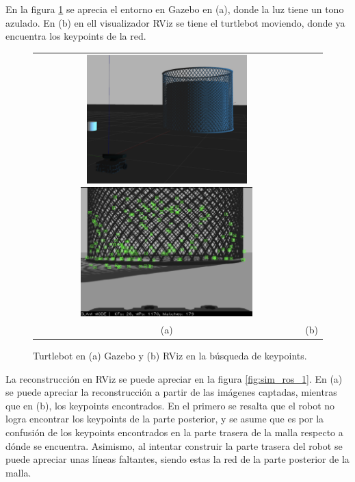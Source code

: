 En la figura \ref{fig:sim_ros} se aprecia el entorno en Gazebo en (a), donde la luz tiene un tono azulado. En (b) en ell visualizador RViz se tiene el turtlebot moviendo, donde ya encuentra los keypoints de la red. 

\begin{figure} [!h]
    \begin{center}
    \begin{tabular}{cc}
    \includegraphics[height=5cm]{images/gazebo_1}
    \includegraphics[height=5cm]{images/rviz_1} \\
    (a) & (b)
    \end{tabular}
    \caption{\label{fig:sim_ros}Turtlebot en (a) Gazebo y (b) RViz en la búsqueda de keypoints.}
    \end{center}
\end{figure}

La reconstrucción en RViz se puede apreciar en la figura \ref{fig:sim_ros_1}. En (a) se puede apreciar la reconstrucción a partir de las imágenes captadas, mientras que en (b), los keypoints encontrados. En el primero se resalta que el robot no logra encontrar los keypoints de la parte posterior, y se asume que es por la confusión de los keypoints encontrados en la parte trasera de la malla respecto a dónde se encuentra. Asimismo, al intentar construir la parte trasera del robot se puede apreciar unas líneas faltantes, siendo estas la red de la parte posterior de la malla.

